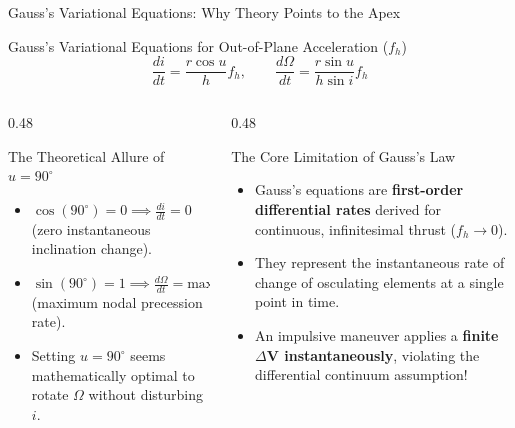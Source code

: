 \documentclass[aspectratio=169,10pt]{beamer}
\begin{document}
\begin{frame}{Gauss's Variational Equations: Why Theory Points to the Apex}
    \begin{block}{Gauss's Variational Equations for Out-of-Plane Acceleration ($f_h$)}
        \footnotesize
        $$\frac{di}{dt} = \frac{r \cos u}{h} f_h, \qquad \frac{d\Omega}{dt} = \frac{r \sin u}{h \sin i} f_h$$
    \end{block}
    \vspace{0.1cm}
    \begin{columns}[t]
        \begin{column}{0.48\textwidth}
            \begin{block}{The Theoretical Allure of $u = 90^\circ$}
                \scriptsize
                \begin{itemize}\setlength{\itemsep}{3pt}
                    \item $\cos(90^\circ) = 0 \implies \frac{di}{dt} = 0$ (zero instantaneous inclination change).
                    \item $\sin(90^\circ) = 1 \implies \frac{d\Omega}{dt} = \text{maximum}$ (maximum nodal precession rate).
                    \item Setting $u = 90^\circ$ seems mathematically optimal to rotate $\Omega$ without disturbing $i$.
                \end{itemize}
            \end{block}
        \end{column}
        
        \begin{column}{0.48\textwidth}
            \begin{alertblock}{The Core Limitation of Gauss's Law}
                \scriptsize
                \begin{itemize}\setlength{\itemsep}{3pt}
                    \item Gauss's equations are \textbf{first-order differential rates} derived for continuous, infinitesimal thrust ($f_h \to 0$).
                    \item They represent the instantaneous rate of change of osculating elements at a single point in time.
                    \item An impulsive maneuver applies a \textbf{finite $\Delta\mathbf{V}$ instantaneously}, violating the differential continuum assumption!
                \end{itemize}
            \end{alertblock}
        \end{column}
    \end{columns}
\end{frame}
\end{document}
